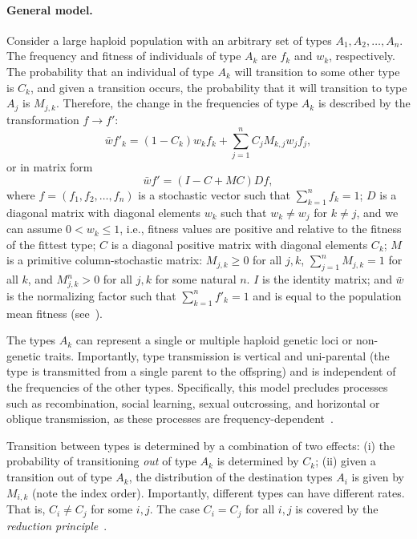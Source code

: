 \documentclass[9pt, a4paper, twocolumn]{extarticle}
\newcommand{\ci}{I}
\begin{document}
\paragraph*{General model.}\label{sec:general_model}
Consider a large haploid population with an arbitrary set of types $A_1, A_2, \ldots, A_n$.
The frequency and fitness of individuals of type $A_k$ are $f_k$ and $w_k$, respectively.
The probability that an individual of type $A_k$ will transition to some other type is $C_k$, and given a transition occurs, the probability that it will transition to type $A_j$ is $M_{j,k}$.
Therefore, the change in the frequencies of type $A_k$ is described by the transformation $f \to f'$: 
\begin{equation}
\bar{w} f'_k = (1-C_k) w_k f_k + \sum_{j=1}^{n}{C_j M_{k,j} w_j f_j},
\label{eq:model_sum}
\end{equation}
or in matrix form
\begin{equation}
\bar{w} f' = (\ci - C + MC)D f,
\label{eq:model}
\end{equation}
where $f=(f_1, f_2, \ldots, f_n)$ is a stochastic vector such that $\sum_{k=1}^n{f_k} = 1$;
$D$ is a diagonal matrix with diagonal elements $w_k$ such that $w_k \ne w_j$ for $k \ne j$, and we can assume $0 < w_k \le 1$, i.e., fitness values are positive and relative to the fitness of the fittest type; 
$C$ is a diagonal positive matrix with diagonal elements $C_k$;
$M$ is a primitive column-stochastic matrix: $M_{j,k} \ge 0$ for all $j,k$, $\sum_{j=1}^n {M_{j,k}} = 1$ for all $k$, and $M^n_{j,k} > 0$ for all $j,k$ for some natural $n$.
$\ci$ is the identity matrix;
and $\bar{w}$ is the normalizing factor such that $\sum_{k=1}^n{f'_k}=1$ and is equal to the population mean fitness (see~).

The types $A_k$ can represent a single or multiple haploid genetic loci or non-genetic traits.
Importantly, type transmission is vertical and uni-parental (the type is transmitted from a single parent to the offspring) and is independent of the frequencies of the other types.
Specifically, this model precludes processes such as recombination, social learning, sexual outcrossing, and horizontal or oblique transmission, as these processes are frequency-dependent~\cite[pg.~54]{Cavalli-Sforza1981}.

Transition between types is determined by a combination of two effects:
(i) the probability of transitioning \emph{out} of type $A_k$ is determined by $C_k$;
(ii) given a transition out of type $A_k$, the distribution of the destination types $A_i$ is given by $M_{i,k}$ (note the index order).
Importantly, different types can have different rates.
That is, $C_i \ne C_j$ for some $i,j$. The case $C_i = C_j$ for all $i,j$ is covered by the \emph{reduction principle}~\citep[see][]{Altenberg2017}.
\end{document}
